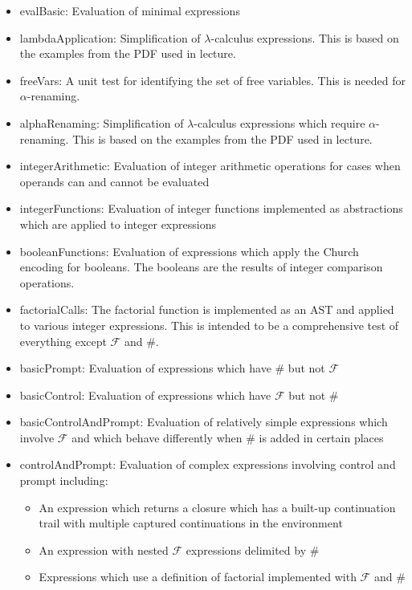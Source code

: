 \documentclass{article}
\begin{document}
\begin{itemize}
\item evalBasic: Evaluation of minimal expressions
\item lambdaApplication: Simplification of $\lambda$-calculus expressions. This is based on the examples from the PDF used in lecture.
\item freeVars: A unit test for identifying the set of free variables. This is needed for $\alpha$-renaming.
\item alphaRenaming: Simplification of $\lambda$-calculus expressions which require $\alpha$-renaming. This is based on the examples from the PDF used in lecture.
\item integerArithmetic: Evaluation of integer arithmetic operations for cases when operands can and cannot be evaluated
\item integerFunctions: Evaluation of integer functions implemented as abstractions which are applied to integer expressions
\item booleanFunctions: Evaluation of expressions which apply the Church encoding for booleans. The booleans are the results of integer comparison operations.
\item factorialCalls: The factorial function is implemented as an AST and applied to various integer expressions. This is intended to be a comprehensive test of everything except $\mathcal{F}$ and $\#$.
\item basicPrompt: Evaluation of expressions which have $\#$ but not $\mathcal{F}$
\item basicControl: Evaluation of expressions which have $\mathcal{F}$ but not $\#$
\item basicControlAndPrompt: Evaluation of relatively simple expressions which involve $\mathcal{F}$ and which behave differently when $\#$ is added in certain places
\item controlAndPrompt: Evaluation of complex expressions involving control and prompt including:
  \begin{itemize}
  \item An expression which returns a closure which has a built-up continuation trail with multiple captured continuations in the environment
  \item An expression with nested $\mathcal{F}$ expressions delimited by $\#$
  \item Expressions which use a definition of factorial implemented with $\mathcal{F}$ and $\#$
  \end{itemize}
\end{itemize}
\end{document}
